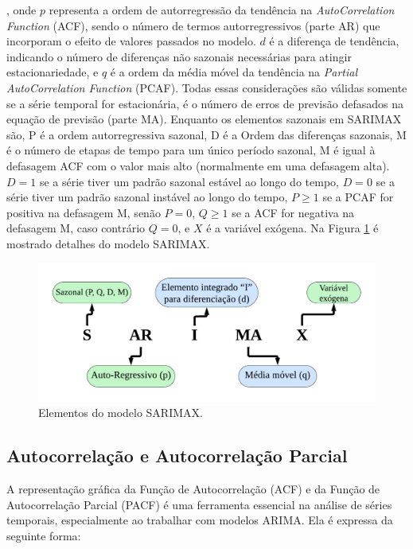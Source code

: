  \noindent, onde $p$ representa a ordem de autorregressão da tendência na \textit{AutoCorrelation Function} (ACF), sendo o número de termos autorregressivos (parte AR) que incorporam o efeito de valores passados no modelo. $d$ é a diferença de tendência, indicando o número de diferenças não sazonais necessárias para atingir estacionariedade, e $q$ é a ordem da média móvel da tendência na \textit{Partial AutoCorrelation Function} (PCAF). Todas essas considerações são válidas somente se a série temporal for estacionária, é o número de erros de previsão defasados na equação de previsão (parte MA). Enquanto os elementos sazonais em SARIMAX são, P é a ordem autorregressiva sazonal, D é a Ordem das diferenças sazonais,
 M é o número de etapas de tempo para um único período sazonal, M é igual à defasagem ACF com o valor mais alto (normalmente em uma defasagem alta). $D=1$ se a série tiver um padrão sazonal estável ao longo do tempo, $D=0$ se a série tiver um padrão sazonal instável ao longo do tempo, $P\geq1$ se a PCAF for positiva na defasagem M, senão $P=0$, $Q\geq1$ se a ACF for negativa na defasagem M, caso contrário $Q=0$, e $X$ é a variável exógena. Na Figura \ref{fig:sarimaxmap} é mostrado detalhes do modelo SARIMAX.
 

 
 \begin{figure}[H]
 	\centering
 	\caption{Elementos do modelo SARIMAX.}
 	\label{fig:sarimaxmap}
 	\includegraphics[width=\linewidth]{Modelos/Figuras/sarimax_map.pdf}
 	
 \end{figure}
 
  \subsection{Autocorrela\c c\~ao e Autocorrela\c c\~ao Parcial}
 
A representação gráfica da Função de Autocorrelação (ACF) e da Função de Autocorrelação Parcial (PACF) é uma ferramenta essencial na análise de séries temporais, especialmente ao trabalhar com modelos ARIMA. Ela é expressa da seguinte forma:

